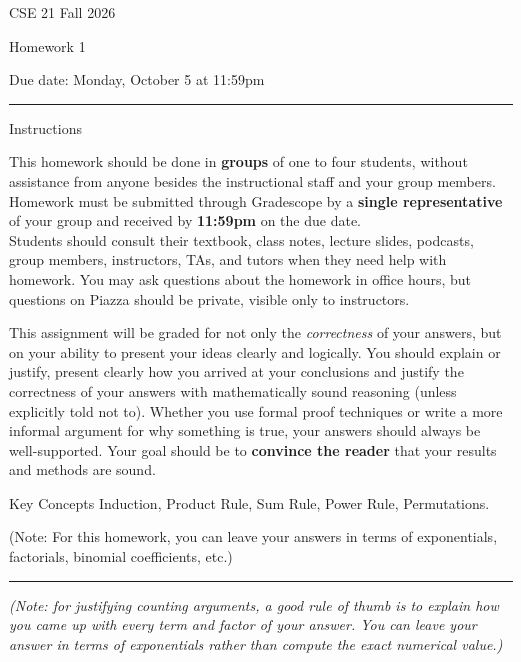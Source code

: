 \documentclass[10pt,letterpaper]{article}
\begin{document}
\hfill{CSE 21 Fall 2026}

\hfill{Homework 1}

\hfill{Due date: Monday, October 5 at 11:59pm}

\begin{center}
\begin{minipage}[t]{5.7in}
\rule{\linewidth}{2pt}
{\sc Instructions}\newline

This homework should be done in {\bf groups} of one to four students, without assistance from anyone besides the instructional staff and your group members.  Homework must be submitted through Gradescope by a {\bf single representative} of your group and received by {\bf 11:59pm} on the due date.\\


Students should consult their textbook, class notes, lecture slides, podcasts, group members, instructors, TAs, and tutors when 
they need help with homework. You may ask questions about the homework in office hours, but questions on Piazza should be private, visible only to instructors. 

This assignment will be graded for not only the \emph{correctness} of your answers, but on your ability to present your ideas clearly and logically. You should explain or justify, present clearly how you arrived at your conclusions and justify the correctness of your answers with mathematically sound reasoning (unless explicitly told not to). Whether you use formal proof techniques or write a more informal argument for why something is true, your answers should always be well-supported. Your goal should be to {\bf convince the reader} that your results and methods are sound.






{\sc Key Concepts} Induction, Product Rule, Sum Rule, Power Rule, Permutations.

(Note: For this homework, you can leave your answers in terms of exponentials, factorials, binomial coefficients, etc.)

\rule{\linewidth}{2pt}
\end{minipage} \hfill

\end{center}

\emph{(Note: for justifying counting arguments, a good rule of thumb is to explain how you came up with every term and factor of your answer. You can leave
your answer in terms of exponentials rather than compute the exact numerical value.)}
\end{document}
